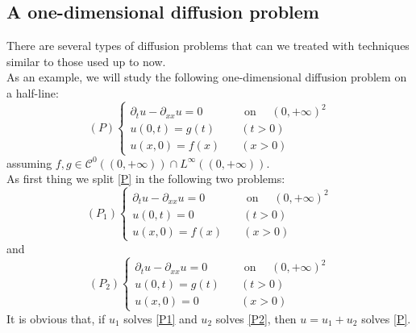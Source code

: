\subsection{A one-dimensional diffusion problem}
There are several types of diffusion problems that can we treated with techniques similar to those used up to now. \\
As an example, we will study the following one-dimensional diffusion problem on a half-line:
\begin{equation}
\label{P}
(P)
    \begin{cases}
        \partial_t u - \partial_{xx} u = 0 &\quad \text{ on } \quad (0,+\infty)^2\\
        u(0,t) = g(t) & \quad (t > 0)\\
        u(x,0) = f(x) & \quad (x  > 0)
    \end{cases}
\end{equation}
assuming $f,g \in \mathcal{C}^0((0,+\infty)) \cap L^\infty((0,+\infty))$.\\
As first thing we split \ref{P} in the following two problems:
\begin{equation}
\label{P1}
(P_1)
    \begin{cases}
        \partial_t u - \partial_{xx} u = 0 &\quad \text{ on } \quad (0,+\infty)^2\\
        u(0,t) = 0 & \quad (t > 0)\\
        u(x,0) = f(x) & \quad (x  > 0)        
    \end{cases}
\end{equation}
and 
\begin{equation}
\label{P2}
(P_2)
    \begin{cases}
        \partial_t u - \partial_{xx} u = 0 &\quad \text{ on } \quad (0,+\infty)^2\\
        u(0,t) = g(t) & \quad (t > 0)\\
        u(x,0) = 0 & \quad (x  > 0)        
    \end{cases}
\end{equation}
It is obvious that, if $u_1$ solves \ref{P1} and $u_2$ solves \ref{P2}, then $u=u_1 + u_2$ solves \ref{P}. 
